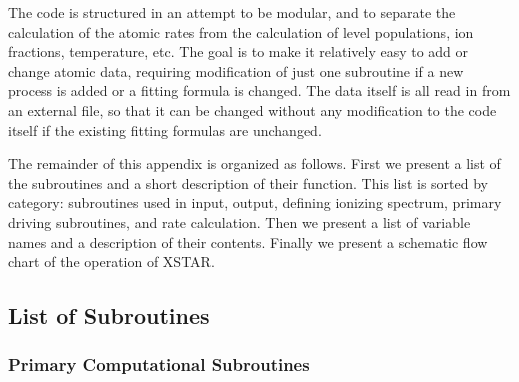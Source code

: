 The code is structured in an attempt to be modular, 
and to separate the calculation of the atomic rates from the 
calculation of level populations, ion fractions, temperature, etc.
The goal is to make it relatively easy to add or change atomic data, 
requiring modification of just one subroutine if a new process is added
or a fitting formula is changed.  The data itself is all read in 
from an external file, so that it can be changed without any 
modification to the code itself if the existing fitting formulas 
are unchanged.

The remainder of this appendix is organized as follows.  First we present 
a list of the subroutines and a short description of their function.
This list is sorted by category:  subroutines used in input, output, 
defining ionizing spectrum, primary driving subroutines, and rate calculation.
Then we present a list of variable names and a description of their contents.
Finally we present a schematic flow chart of the operation of XSTAR.

\subsection {List of Subroutines}

\subsubsection {Primary Computational Subroutines}

